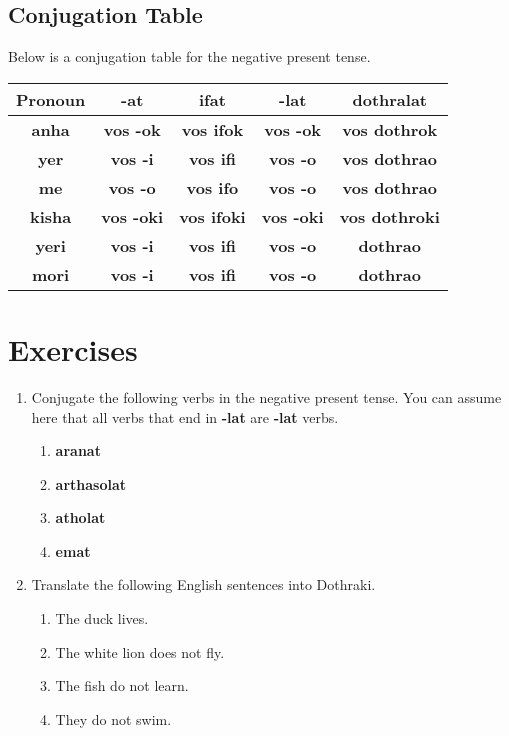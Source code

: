 \subsection*{Conjugation Table}
Below is a conjugation table for the negative present tense. \\
\begin{tabular}{|c|c|c|c|c|}
		\hline
		Pronoun & \textbf{-at} & \textbf{ifat} & \textbf{-lat} & \textbf{dothralat} \\
		\hline
		\textbf{anha} & \textbf{vos -ok} & \textbf{vos ifok} & \textbf{vos -ok} & \textbf{vos dothrok} \\
		\hline
		\textbf{yer} & \textbf{vos -i} & \textbf{vos ifi} & \textbf{vos -o} & \textbf{vos dothrao} \\
		\hline
		\textbf{me} & \textbf{vos -o} & \textbf{vos ifo} & \textbf{vos -o} & \textbf{vos dothrao} \\
		\hline
		\textbf{kisha} & \textbf{vos -oki} & \textbf{vos ifoki} & \textbf{vos -oki} & \textbf{vos dothroki} \\
		\hline
		\textbf{yeri} & \textbf{vos -i} & \textbf{vos ifi} & \textbf{vos -o} & \textbf{dothrao} \\
		\hline
		\textbf{mori} & \textbf{vos -i} & \textbf{vos ifi} & \textbf{vos -o} & \textbf{dothrao} \\
		\hline
\end{tabular}
\section*{Exercises}
\begin{enumerate}
	\item Conjugate the following verbs in the negative present tense. You can assume here that all verbs that end in
				\textbf{-lat} are \textbf{-lat} verbs.
		\begin{enumerate}
			\item \textbf{aranat}
			\item \textbf{arthasolat}
			\item \textbf{atholat}
			\item \textbf{emat}
		\end{enumerate}
	\item Translate the following English sentences into Dothraki.
		\begin{enumerate}
			\item The duck lives.
			\item The white lion does not fly.
			\item The fish do not learn.
			\item They do not swim.
		\end{enumerate}
\end{enumerate}
